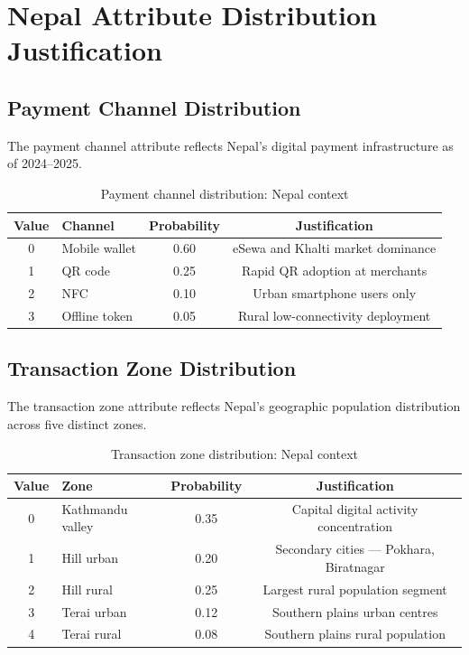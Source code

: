 \chapter{Nepal Attribute Distribution Justification}
\label{app:e_distributions}

\section*{Payment Channel Distribution}

The payment channel attribute reflects Nepal's digital
payment infrastructure as of 2024--2025.

\begin{table}[H]
\centering
\caption{Payment channel distribution: Nepal context}
\begin{tabular}{clcc}
\toprule
\textbf{Value} & \textbf{Channel} &
\textbf{Probability} & \textbf{Justification}\\
\midrule
0 & Mobile wallet  & 0.60 &
eSewa and Khalti market dominance\\
1 & QR code        & 0.25 &
Rapid QR adoption at merchants\\
2 & NFC            & 0.10 &
Urban smartphone users only\\
3 & Offline token  & 0.05 &
Rural low-connectivity deployment\\
\bottomrule
\end{tabular}
\end{table}

\section*{Transaction Zone Distribution}

The transaction zone attribute reflects Nepal's geographic
population distribution across five distinct zones.

\begin{table}[H]
\centering
\caption{Transaction zone distribution: Nepal context}
\begin{tabular}{clcc}
\toprule
\textbf{Value} & \textbf{Zone} &
\textbf{Probability} & \textbf{Justification}\\
\midrule
0 & Kathmandu valley & 0.35 &
Capital digital activity concentration\\
1 & Hill urban       & 0.20 &
Secondary cities --- Pokhara, Biratnagar\\
2 & Hill rural       & 0.25 &
Largest rural population segment\\
3 & Terai urban      & 0.12 &
Southern plains urban centres\\
4 & Terai rural      & 0.08 &
Southern plains rural population\\
\bottomrule
\end{tabular}
\end{table}

